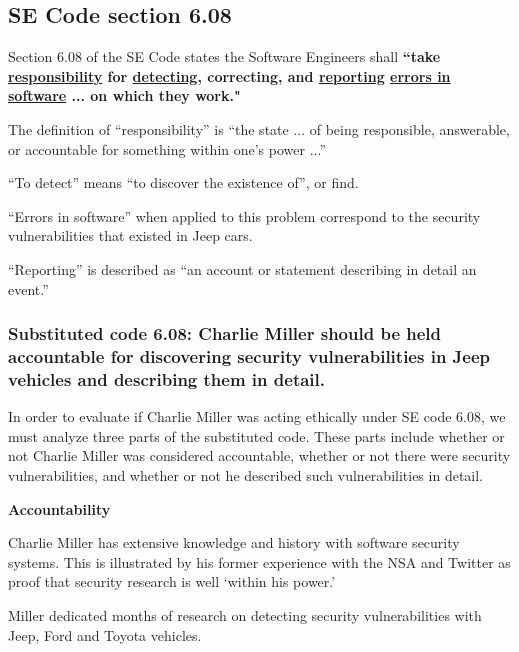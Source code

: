 \documentclass[12pt]{article}
\begin{document}
\begin{multicols}{2}

\subsection{SE Code section 6.08}

Section 6.08 of the SE Code states the Software Engineers shall \textbf{``take \underline{responsibility} for \underline{detecting}, correcting, and \underline{reporting} \underline{errors in software} ... on which they work."}\cite{seCode}

The definition of ``responsibility'' is ``the state ... of being responsible, answerable, or accountable for something within one's power ...''\cite{dictionary}

``To detect'' means ``to discover the existence of''\cite{dictionary}, or find.

``Errors in software'' when applied to this problem correspond to the security vulnerabilities that existed in Jeep cars. 

``Reporting'' is described as ``an account or statement describing in detail an event.''\cite{dictionary}

\subsubsection{Substituted code 6.08: Charlie Miller should be held accountable for discovering security vulnerabilities in Jeep vehicles and describing them in detail.}

In order to evaluate if Charlie Miller was acting ethically under SE code 6.08, we must analyze three parts of the substituted code. These parts include whether or not Charlie Miller was considered accountable, whether or not there were security vulnerabilities, and whether or not he described such vulnerabilities in detail. 

\vspace{.5cm}\hspace{-.5cm}\textbf{Accountability}\vspace{.2cm}

Charlie Miller has extensive knowledge and history with software security systems. This is illustrated by his former experience with the NSA and Twitter\cite{linkedin} as proof that security research is well `within his power.' 

Miller dedicated months of research on detecting security vulnerabilities with Jeep, Ford and Toyota vehicles.\cite{officialPaper}


\end{multicols}
\end{document}
